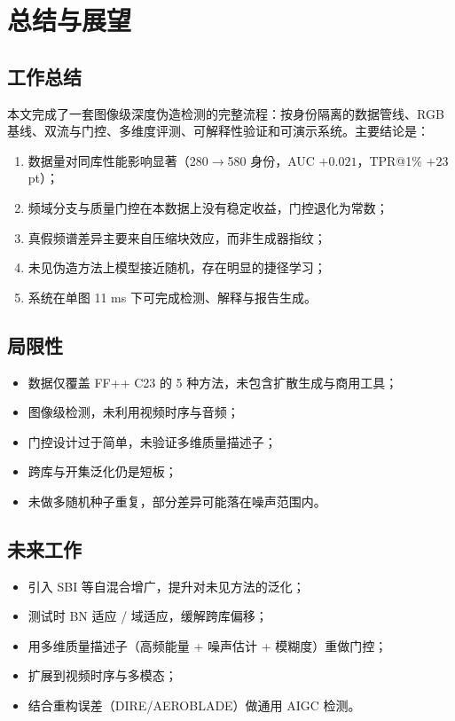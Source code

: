 \section{总结与展望}

\subsection{工作总结}

本文完成了一套图像级深度伪造检测的完整流程：按身份隔离的数据管线、RGB 基线、双流与门控、多维度评测、可解释性验证和可演示系统。主要结论是：

\begin{enumerate}
  \item 数据量对同库性能影响显著（280$\to$580 身份，AUC $+0.021$，TPR@1\% $+23$ pt）；
  \item 频域分支与质量门控在本数据上没有稳定收益，门控退化为常数；
  \item 真假频谱差异主要来自压缩块效应，而非生成器指纹；
  \item 未见伪造方法上模型接近随机，存在明显的捷径学习；
  \item 系统在单图 11 ms 下可完成检测、解释与报告生成。
\end{enumerate}

\subsection{局限性}

\begin{itemize}
  \item 数据仅覆盖 FF++ C23 的 5 种方法，未包含扩散生成与商用工具；
  \item 图像级检测，未利用视频时序与音频；
  \item 门控设计过于简单，未验证多维质量描述子；
  \item 跨库与开集泛化仍是短板；
  \item 未做多随机种子重复，部分差异可能落在噪声范围内。
\end{itemize}

\subsection{未来工作}

\begin{itemize}
  \item 引入 SBI 等自混合增广，提升对未见方法的泛化；
  \item 测试时 BN 适应 / 域适应，缓解跨库偏移；
  \item 用多维质量描述子（高频能量 + 噪声估计 + 模糊度）重做门控；
  \item 扩展到视频时序与多模态；
  \item 结合重构误差（DIRE/AEROBLADE）做通用 AIGC 检测。
\end{itemize}
